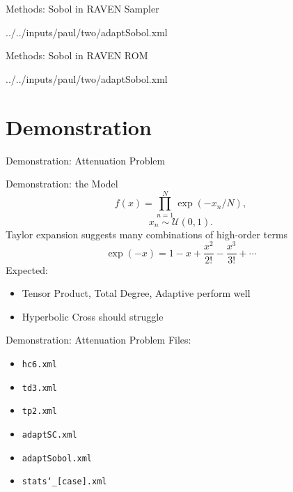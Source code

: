 \documentclass[t,9pt,svgnames]{beamer}
\newcommand{\code}[1]{\texttt{#1}}
\begin{document}
\begin{frame}{Methods: Sobol in RAVEN}
  \vfill
  Sampler
  
          {../../inputs/paul/two/adaptSobol.xml}
  \vfill
\end{frame}

\begin{frame}{Methods: Sobol in RAVEN}
  \vfill
  ROM
  
          {../../inputs/paul/two/adaptSobol.xml}
  \vfill
\end{frame}
%
%
\section{Demonstration}
\begin{frame}{Demonstration: Attenuation Problem}
\end{frame}

\begin{frame}{Demonstration: the Model}
  \vfill
  \begin{equation}
    f(x) = \prod_{n=1}^N \exp(-x_n/N),
  \end{equation}
  \vfill
  \begin{equation}
    x_n \sim \mathcal{U}(0,1).
  \end{equation}
  \vfill
  Taylor expansion suggests many combinations of high-order terms
  \begin{equation}
    \exp(-x) = 1-x+\frac{x^2}{2!}-\frac{x^3}{3!}+\cdots
  \end{equation}
  \vfill
  Expected: 
  \vfill
  \begin{itemize}
  \vfill
    \item Tensor Product, Total Degree, Adaptive perform well
  \vfill
    \item Hyperbolic Cross should struggle
  \end{itemize}
  \vfill
\end{frame}

\begin{frame}{Demonstration: Attenuation Problem}
  \vfill
  Files:
  \vfill
  \begin{itemize}
    \item \code{hc6.xml}
  \vfill
    \item \code{td3.xml}
  \vfill
    \item \code{tp2.xml}
  \vfill
    \item \code{adaptSC.xml}
  \vfill
    \item \code{adaptSobol.xml}
  \vfill
    \item \code{stats\char`_[case].xml}
  \end{itemize}
  \vfill
\end{frame}
\end{document}
